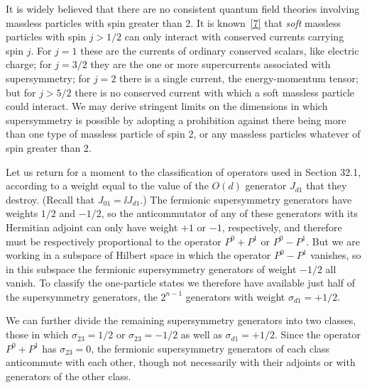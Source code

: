 It is widely believed that there are no consistent quantum field theories
involving massless particles with spin greater than 2. It is
known~\hyperref[ch32-ref-7]{[7]} that \emph{soft} massless particles with
spin \(j>1/2\) can only interact with conserved currents carrying spin
\(j\). For \(j=1\) these are the currents of ordinary conserved scalars,
like electric charge; for \(j=3/2\) they are the one or more supercurrents
associated with supersymmetry; for \(j=2\) there is a single current, the
energy-momentum tensor; but for \(j>5/2\) there is no conserved current
with which a soft massless particle could interact. We may derive
stringent limits on the dimensions in which supersymmetry is possible by
adopting a prohibition against there being more than one type of massless
particle of spin 2, or any massless particles whatever of spin greater
than 2.

Let us return for a moment to the classification of operators used in
Section 32.1, according to a weight equal to the value of the \(O(d)\)
generator \(J_{d1}\) that they destroy. (Recall that
\(J_{01}=\ii J_{d1}\).) The fermionic supersymmetry generators have weights
\(1/2\) and \(-1/2\), so the anticommutator of any of these generators
with its Hermitian adjoint can only have weight \(+1\) or \(-1\),
respectively, and therefore must be respectively proportional to the
operator \(P^0+P^1\) or \(P^0-P^1\). But we are working in a subspace of
Hilbert space in which the operator \(P^0-P^1\) vanishes, so in this
subspace the fermionic supersymmetry generators of weight \(-1/2\) all
vanish. To classify the one-particle states we therefore have available
just half of the supersymmetry generators, the \(2^{n-1}\) generators with
weight \(\sigma_{d1}=+1/2\).

We can further divide the remaining supersymmetry generators into two
classes, those in which \(\sigma_{23}=1/2\) or
\(\sigma_{23}=-1/2\) as well as \(\sigma_{d1}=+1/2\). Since the operator
\(P^0+P^1\) has \(\sigma_{23}=0\), the fermionic supersymmetry generators
of each class anticommute with each other, though not necessarily with
their adjoints or with generators of the other class.

